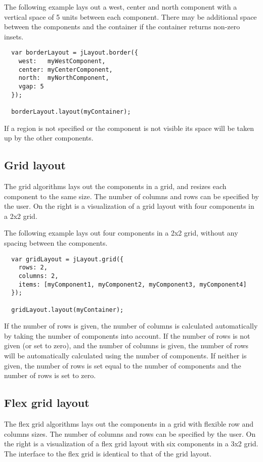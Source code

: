 The following example lays out a west, center and north component with a vertical space of 5 units between each component. There may be additional space between the components and the container if the container returns non-zero insets.
\begin{verbatim}
  var borderLayout = jLayout.border({
    west:   myWestComponent,
    center: myCenterComponent,
    north:  myNorthComponent,
    vgap: 5
  });

  borderLayout.layout(myContainer);
\end{verbatim}
If a region is not specified or the component is not visible its space will be taken up by the other components. 

\subsection{Grid layout}
The grid algorithms lays out the components in a grid, and resizes each component to the same size. The number of columns and rows can be specified by the user. On the right is a visualization of a grid layout with four components in a 2x2 grid. 

The following example lays out four components in a 2x2 grid, without any spacing between the components.
\begin{verbatim}
  var gridLayout = jLayout.grid({
    rows: 2,
    columns: 2,
    items: [myComponent1, myComponent2, myComponent3, myComponent4]
  });

  gridLayout.layout(myContainer);
\end{verbatim}
If the number of rows is given, the number of columns is calculated automatically by taking the number of components into account. If the number of rows is not given (or set to zero), and the number of columns is given, the number of rows will be automatically calculated using the number of components. If neither is given, the number of rows is set equal to the number of components and the number of rows is set to zero.

\subsection{Flex grid layout}
The flex grid algorithms lays out the components in a grid with flexible row and columns sizes. The number of columns and rows can be specified by the user. On the right is a visualization of a flex grid layout with six components in a 3x2 grid. The interface to the flex grid is identical to that of the grid layout.

